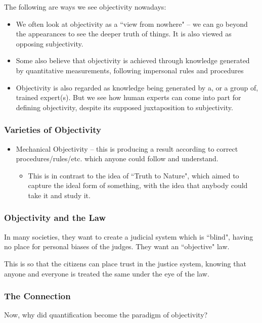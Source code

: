 \documentclass[openany]{book}
\begin{document}
The following are ways we see objectivity nowadays:
\begin{itemize}
	\item We often look at objectivity as a ``view from nowhere" -- we can go beyond the appearances to see the deeper truth of things. It is also viewed as opposing subjectivity.
	
	\item Some also believe that objectivity is achieved through knowledge generated by quantitative measurements, following impersonal rules and procedures
	
	\item Objectivity is also regarded as knowledge being generated by a, or a group of, trained expert(s). But we see how human experts can come into part for defining objectivity, despite its supposed juxtaposition to subjectivity.
\end{itemize}

\subsubsection{Varieties of Objectivity}
\begin{itemize}
	\item Mechanical Objectivity -- this is producing a result according to correct procedures/rules/etc. which anyone could follow and understand.
	\begin{itemize}
		\item This is in contrast to the idea of ``Truth to Nature", which aimed to capture the ideal form of something, with the idea that anybody could take it and study it.
	\end{itemize}
\end{itemize}

\subsubsection{Objectivity and the Law}
In many societies, they want to create a judicial system which is ``blind", having no place for personal biases of the judges. They want an ``objective" law.

This is so that the citizens can place trust in the justice system, knowing that anyone and everyone is treated the same under the eye of the law.

\subsubsection{The Connection}
Now, why did quantification become the paradigm of objectivity?
\end{document}
